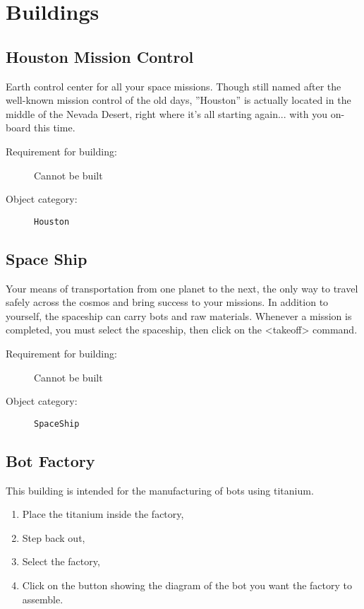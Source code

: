 
\section{Buildings}

\subsection{Houston Mission Control}

Earth control center for all your space missions. Though still named after the well-known mission control of the old days, ''Houston'' is actually located in the middle of the Nevada Desert, right where it's all starting again... with you on-board this time.

\begin{description}
    \item[Requirement for building:] Cannot be built
    \item[Object category:] \texttt{Houston}
\end{description}


\subsection{Space Ship}

Your means of transportation from one planet to the next, the only way to travel safely across the cosmos and bring success to your missions. In addition to yourself, the spaceship can carry bots and raw materials. Whenever a mission is completed, you must select the spaceship, then click on the <takeoff> command.

\begin{description}
    \item[Requirement for building:] Cannot be built
    \item[Object category:] \texttt{SpaceShip}
\end{description}


\subsection{Bot Factory}

This building is intended for the manufacturing of bots using titanium.

\begin{enumerate}
    \item Place the titanium inside the factory,
    \item Step back out,
    \item Select the factory,
    \item Click on the button showing the diagram of the bot you want the factory to assemble.
\end{enumerate}

